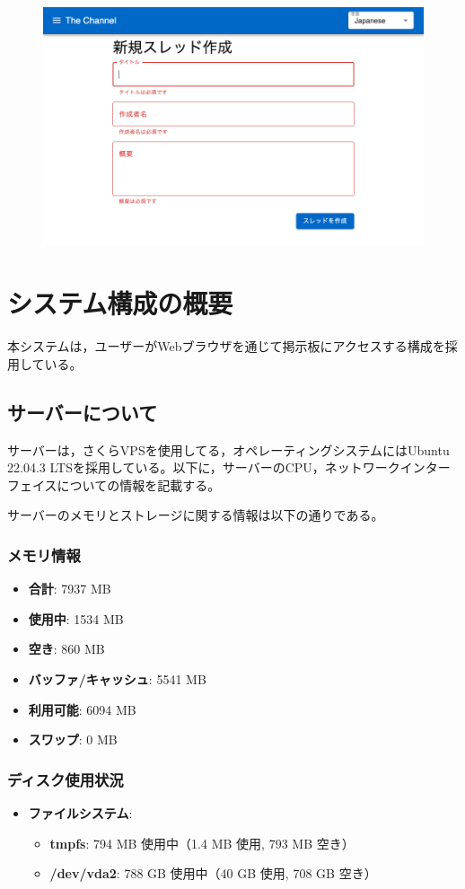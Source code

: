 \documentclass[b5paper,12pt]{jsreport}
\begin{document}
\begin{figure}[htbp]
	\centering
	\includegraphics[width=90mm，height=45mm]{./img/thread_create_error.png}
\end{figure}

\section{システム構成の概要}
本システムは，ユーザーがWebブラウザを通じて掲示板にアクセスする構成を採用している。


\subsection{サーバーについて}
サーバーは，さくらVPSを使用してる，オペレーティングシステムにはUbuntu 22.04.3 LTSを採用している。以下に，サーバーのCPU，ネットワークインターフェイスについての情報を記載する。

サーバーのメモリとストレージに関する情報は以下の通りである。

\subsubsection{メモリ情報}
\begin{itemize}
    \item \textbf{合計}: 7937 MB
    \item \textbf{使用中}: 1534 MB
    \item \textbf{空き}: 860 MB
    \item \textbf{バッファ/キャッシュ}: 5541 MB
    \item \textbf{利用可能}: 6094 MB
    \item \textbf{スワップ}: 0 MB
\end{itemize}

\subsubsection{ディスク使用状況}
\begin{itemize}
    \item \textbf{ファイルシステム}:
        \begin{itemize}
            \item \textbf{tmpfs}: 794 MB 使用中（1.4 MB 使用, 793 MB 空き）
            \item \textbf{/dev/vda2}: 788 GB 使用中（40 GB 使用, 708 GB 空き）
        \end{itemize}
\end{itemize}
\end{document}
